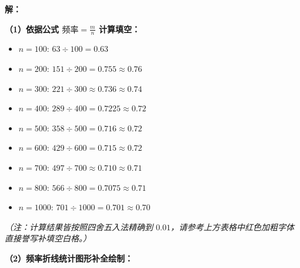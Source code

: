 \vspace{0.4cm}
\textbf{解：}

\textbf{（1）依据公式 $\text{频率} = \frac{m}{n}$ 计算填空：}
\begin{itemize}
    \item $n=100$: $63 \div 100 = 0.63$
    \item $n=200$: $151 \div 200 = 0.755 \approx 0.76$
    \item $n=300$: $221 \div 300 \approx 0.736 \approx 0.74$
    \item $n=400$: $289 \div 400 = 0.7225 \approx 0.72$
    \item $n=500$: $358 \div 500 = 0.716 \approx 0.72$
    \item $n=600$: $429 \div 600 = 0.715 \approx 0.72$
    \item $n=700$: $497 \div 700 \approx 0.710 \approx 0.71$
    \item $n=800$: $566 \div 800 = 0.7075 \approx 0.71$
    \item $n=1000$: $701 \div 1000 = 0.701 \approx 0.70$
\end{itemize}
\textit{（注：计算结果皆按照四舍五入法精确到 $0.01$，请参考上方表格中红色加粗字体直接誉写补填空白格。）}

\textbf{（2）频率折线统计图形补全绘制：}

